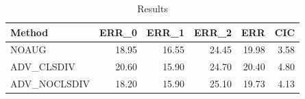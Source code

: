 \begin{table}
\caption{Results}
\label{tab:Results}
\begin{tabular}{lrrrrr}
\toprule
Method & ERR\_0 & ERR\_1 & ERR\_2 & ERR & CIC \\
\midrule
NOAUG & 18.95 & 16.55 & 24.45 & 19.98 & 3.58 \\
ADV\_CLSDIV & 20.60 & 15.90 & 24.70 & 20.40 & 4.80 \\
ADV\_NOCLSDIV & 18.20 & 15.90 & 25.10 & 19.73 & 4.13 \\
\bottomrule
\end{tabular}
\end{table}
